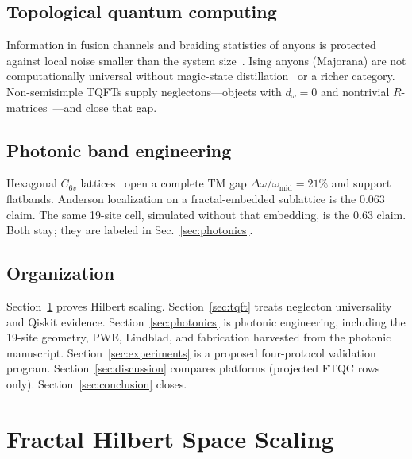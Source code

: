 \documentclass[aps,prx,twocolumn,superscriptaddress,floatfix]{revtex4-2}
\theoremstyle{plain}
\theoremstyle{definition}
\begin{document}
\subsection{Topological quantum computing}

Information in fusion channels and braiding statistics of anyons is protected against local noise smaller than the system size~\cite{Kitaev2003,Nayak2008}. Ising anyons (Majorana) are not computationally universal without magic-state distillation~\cite{Bravyi2005} or a richer category. Non-semisimple TQFTs supply neglectons---objects with $d_\omega = 0$ and nontrivial $R$-matrices~\cite{Wen2017,Gainutdinov2020}---and close that gap.

\subsection{Photonic band engineering}

Hexagonal $C_{6v}$ lattices~\cite{Yablonovitch1987,John1987,Joannopoulos2008} open a complete TM gap $\Delta\omega/\omega_{\mathrm{mid}} = 21\%$ and support flatbands. Anderson localization on a fractal-embedded sublattice is the $0.063$ claim. The same 19-site cell, simulated without that embedding, is the $0.63$ claim. Both stay; they are labeled in Sec.~\ref{sec:photonics}.

\subsection{Organization}

Section~\ref{sec:hilbert_scaling} proves Hilbert scaling. Section~\ref{sec:tqft} treats neglecton universality and Qiskit evidence. Section~\ref{sec:photonics} is photonic engineering, including the 19-site geometry, PWE, Lindblad, and fabrication harvested from the photonic manuscript. Section~\ref{sec:experiments} is a proposed four-protocol validation program. Section~\ref{sec:discussion} compares platforms (projected FTQC rows only). Section~\ref{sec:conclusion} closes.

\section{Fractal Hilbert Space Scaling}
\label{sec:hilbert_scaling}

\end{document}

